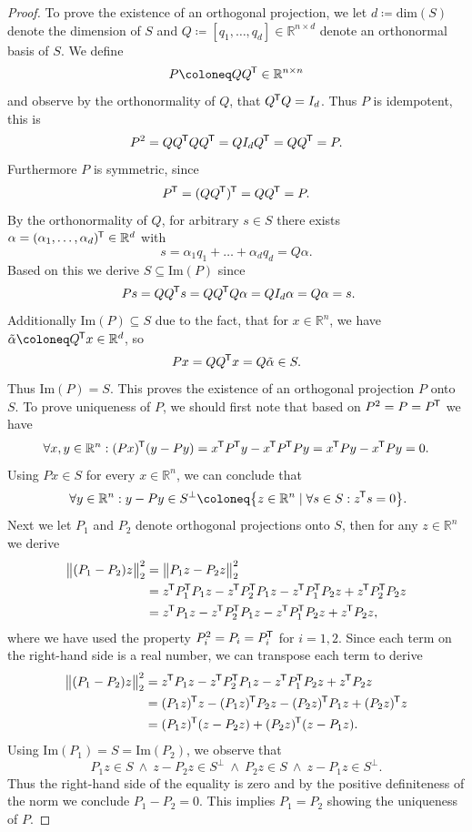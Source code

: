 \documentclass[11pt, a4paper]{article}
\newcommand{\R}{\mathbb{R}}
\newcommand*{\tr}{^{\mkern-1.5mu\mathsf{T}}}
\begin{document}
\begin{proof}
To prove the existence of an orthogonal projection, we let $d \coloneq \text{dim}(S)$ denote the dimension of $S$ and $Q \coloneq [q_1, \dots, q_d] \in \R^{n \times d}$ denote an orthonormal basis of $S$. We define
\[ P \coloneq QQ\tr  \in \R^{n \times n} \]
and observe by the orthonormality of $Q$, that $Q\tr Q = I_d$. Thus $P$ is idempotent, this is
\[ P^2 = QQ\tr QQ\tr = Q I_d Q\tr = QQ\tr = P. \]
Furthermore $P$ is symmetric, since 
\[ P\tr = (QQ\tr)\tr = QQ\tr = P. \]
By the orthonormality of $Q$, for arbitrary $s \in S$ there exists $\alpha = (\alpha_1, \dots, \alpha_d)\tr \in \R^d$ with
\[ s = \alpha_1q_1 + \dots + \alpha_dq_d = Q\alpha. \]
Based on this we derive $S \subseteq \text{Im}(P)$ since
\[ Ps = QQ\tr s = QQ\tr Q\alpha = QI_d\alpha = Q\alpha =s. \]
Additionally $\text{Im}(P) \subseteq S$ due to the fact, that for $x \in \R^n$, we have $\tilde{\alpha} \coloneq Q\tr x \in \R^d$, so
\[ Px = QQ\tr x = Q\tilde{\alpha} \in S. \]
Thus $\text{Im}(P) = S$. This proves the existence of an orthogonal projection $P$ onto $S$. To prove uniqueness of $P$, we should first note that based on $P^2 = P = P\tr $ we have
\[ \forall x,y \in \R^n : (Px)\tr (y-Py) = x\tr P\tr y - x\tr P\tr Py = x\tr Py - x\tr Py = 0. \]
Using $Px \in S$ for every $x \in \R^n$, we can conclude that 
\[ \forall y \in \R^n : y - Py \in S^\perp \coloneq \big \{ z \in \R^n \mid \forall s \in S : z\tr s = 0 \big \}. \]
Next we let $P_1$ and $P_2$ denote orthogonal projections onto $S$, then for any $z \in \R^n$ we derive
\[ \begin{split}
\big \| (P_1-P_2)z \big \|_2^2 
&= \big \| P_1z -P_2z \big \|_2^2 \\\
&= z\tr P_1\tr P_1z - z\tr P_2\tr P_1z -  z\tr P_1\tr P_2z + z\tr P_2\tr P_2z \\\
&= z\tr P_1z - z\tr P_2\tr P_1z -  z\tr P_1\tr P_2z + z\tr P_2z,
\end{split} \]
where we have used the property $P_i^2 = P_i = P_i\tr $ for $i=1,2$. Since each term on the right-hand side is a real number, we can transpose each term to derive
\[ \begin{split}
\big \| (P_1-P_2)z \big \|_2^2 
&=  z\tr P_1z - z\tr P_2\tr P_1z -  z\tr P_1\tr P_2z + z\tr P_2z \\\
&= (P_1z)\tr z - (P_1z)\tr P_2z - (P_2z)\tr P_1z + (P_2z)\tr z \\\
&= (P_1z)\tr (z-P_2z) + (P_2z)\tr (z-P_1z).
\end{split} \] 
Using $\text{Im}(P_1) = S = \text{Im}(P_2)$, we observe that 
\[ P_1z \in S \ \wedge \ z-P_2z \in S^\perp \ \wedge \ P_2z \in S \ \wedge \ z - P_1z \in S^\perp. \]
Thus the right-hand side of the equality is zero and by the positive definiteness of the norm we conclude $P_1 - P_2 = 0$. This implies $P_1 = P_2$ showing the uniqueness of $P$.
\end{proof}
\end{document}
